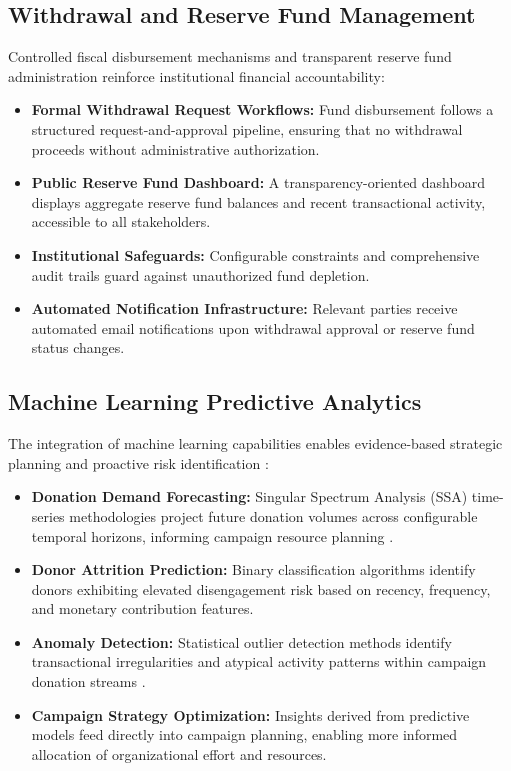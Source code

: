 \documentclass{thesis-library}
\begin{document}
\subsection{Withdrawal and Reserve Fund Management}

Controlled fiscal disbursement mechanisms and transparent reserve fund administration reinforce institutional financial accountability:
\begin{itemize}
    \item \textbf{Formal Withdrawal Request Workflows:} Fund disbursement follows a structured request-and-approval pipeline, ensuring that no withdrawal proceeds without administrative authorization.
    \item \textbf{Public Reserve Fund Dashboard:} A transparency-oriented dashboard displays aggregate reserve fund balances and recent transactional activity, accessible to all stakeholders.
    \item \textbf{Institutional Safeguards:} Configurable constraints and comprehensive audit trails guard against unauthorized fund depletion.
    \item \textbf{Automated Notification Infrastructure:} Relevant parties receive automated email notifications upon withdrawal approval or reserve fund status changes.
\end{itemize}

\subsection{Machine Learning Predictive Analytics}

The integration of machine learning capabilities enables evidence-based strategic planning and proactive risk identification \cite{chen2022machine,gupta2020donor}:
\begin{itemize}
    \item \textbf{Donation Demand Forecasting:} Singular Spectrum Analysis (SSA) time-series methodologies project future donation volumes across configurable temporal horizons, informing campaign resource planning \cite{hassani2007singular}.
    \item \textbf{Donor Attrition Prediction:} Binary classification algorithms identify donors exhibiting elevated disengagement risk based on recency, frequency, and monetary contribution features.
    \item \textbf{Anomaly Detection:} Statistical outlier detection methods identify transactional irregularities and atypical activity patterns within campaign donation streams \cite{ahmed2021anomaly,liu2008isolation}.
    \item \textbf{Campaign Strategy Optimization:} Insights derived from predictive models feed directly into campaign planning, enabling more informed allocation of organizational effort and resources.
\end{itemize}
\end{document}
